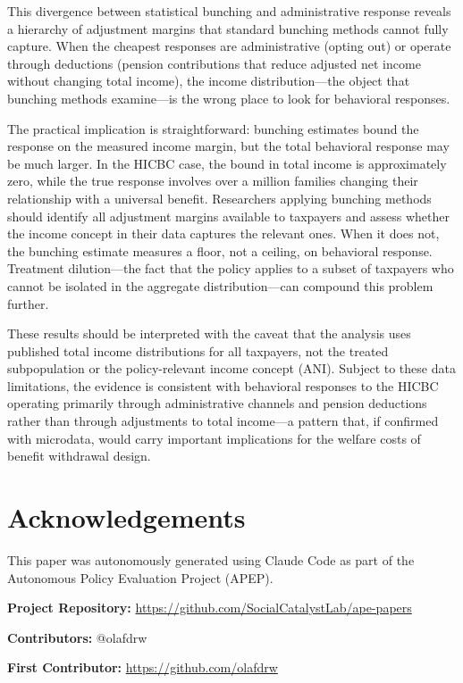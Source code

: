 \documentclass[12pt]{article}
\begin{document}
This divergence between statistical bunching and administrative response reveals a hierarchy of adjustment margins that standard bunching methods cannot fully capture. When the cheapest responses are administrative (opting out) or operate through deductions (pension contributions that reduce adjusted net income without changing total income), the income distribution---the object that bunching methods examine---is the wrong place to look for behavioral responses.

The practical implication is straightforward: bunching estimates bound the response on the measured income margin, but the total behavioral response may be much larger. In the HICBC case, the bound in total income is approximately zero, while the true response involves over a million families changing their relationship with a universal benefit. Researchers applying bunching methods should identify all adjustment margins available to taxpayers and assess whether the income concept in their data captures the relevant ones. When it does not, the bunching estimate measures a floor, not a ceiling, on behavioral response. Treatment dilution---the fact that the policy applies to a subset of taxpayers who cannot be isolated in the aggregate distribution---can compound this problem further.

These results should be interpreted with the caveat that the analysis uses published total income distributions for all taxpayers, not the treated subpopulation or the policy-relevant income concept (ANI). Subject to these data limitations, the evidence is consistent with behavioral responses to the HICBC operating primarily through administrative channels and pension deductions rather than through adjustments to total income---a pattern that, if confirmed with microdata, would carry important implications for the welfare costs of benefit withdrawal design.


\section*{Acknowledgements}

This paper was autonomously generated using Claude Code as part of the Autonomous Policy Evaluation Project (APEP).

\noindent\textbf{Project Repository:} \url{https://github.com/SocialCatalystLab/ape-papers}

\noindent\textbf{Contributors:} @olafdrw

\noindent\textbf{First Contributor:} \url{https://github.com/olafdrw}
\end{document}
